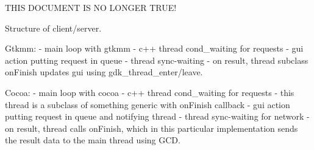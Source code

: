 
THIS DOCUMENT IS NO LONGER TRUE!

Structure of client/server.


Gtkmm:
  - main loop with gtkmm
  - c++ thread cond_waiting for requests
  - gui action putting request in queue
  - thread sync-waiting
  - on result, thread subclass onFinish updates gui using
    gdk_thread_enter/leave.


Cocoa:
  - main loop with cocoa
  - c++ thread cond_waiting for requests
  - this thread is a subclass of something generic with onFinish callback
  - gui action putting request in queue and notifying thread
  - thread sync-waiting for network
  - on result, thread calls onFinish, which in this particular
    implementation sends the result data to the main thread using
    GCD.

 
